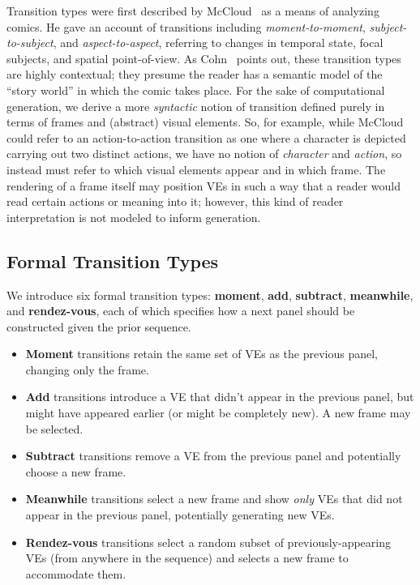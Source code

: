 Transition types were first described by
McCloud~\cite{mcCloud1993understanding} as a means of analyzing
comics. He gave an account of transitions including {\em moment-to-moment},
{\em subject-to-subject}, and {\em aspect-to-aspect}, referring to changes
in temporal state, focal subjects, and spatial point-of-view. As
Cohn~\cite{cohn2013visual} points out, these transition types are
highly contextual; they presume the reader has a semantic model of the
``story world'' in which the comic takes place. For the sake of
computational generation, we derive a more {\em syntactic} notion of
transition defined purely in terms of frames and (abstract) visual
elements. So, for example, while McCloud could refer to an action-to-action
transition as one where a character is depicted carrying out two distinct
actions, we have no notion of {\em character} and {\em action}, so instead
must refer to which visual elements appear and in which frame. The
rendering of a frame itself may position VEs in such a way that a reader
would read certain actions or meaning into it; however, this kind of reader
interpretation is not modeled to inform generation.

\subsection{Formal Transition Types}

We introduce six formal transition types: {\bf moment}, {\bf add}, {\bf
subtract}, {\bf meanwhile}, and {\bf rendez-vous}, each of which specifies
how a next panel should be constructed given the prior sequence.

\begin{itemize}
\item {\bf Moment} transitions retain the same set of VEs as the previous panel, 
changing only the frame.

\item {\bf Add} transitions introduce a VE that didn't appear in the
previous panel, but might have appeared earlier (or might be completely
new). A new frame may be selected.

\item {\bf Subtract} transitions remove a VE from the previous panel and
potentially choose a new frame.

\item {\bf Meanwhile} transitions select a new frame and show {\em only}
VEs that did not appear in the previous panel, potentially generating new
VEs.

\item {\bf Rendez-vous} transitions select a random subset of
previously-appearing VEs (from anywhere in the sequence) and selects a new
frame to accommodate them.
\end{itemize}

